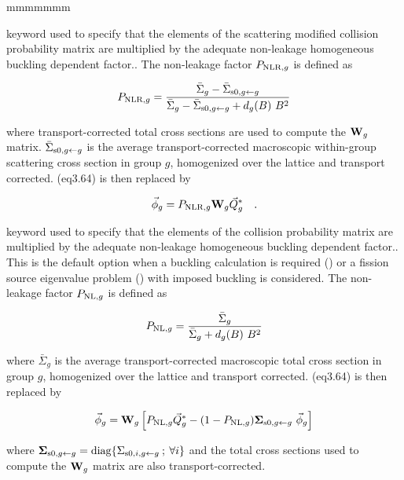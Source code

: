 \begin{ListeDeDescription}{mmmmmmm}
\item[\moc{PNLR}] keyword used to specify that the elements of the scattering
modified collision probability matrix
are multiplied by the adequate non-leakage homogeneous buckling dependent
factor.\cite{ALSB1}. The non-leakage
factor $P_{{\rm NLR},g}$ is defined as

\begin{equation}
P_{{\rm NLR},g}={\bar\Sigma_g-\bar\Sigma_{{\rm s0},g \gets g}\over{\bar\Sigma_g-\bar\Sigma_{{\rm s0},g \gets g}+d_g(B) \ B^2}}
\end{equation}

\noindent where transport-corrected total
cross sections are used to compute the ${\bf W}_g$ matrix. $\bar\Sigma_{{\rm s0},g \gets g}$ is the average
transport-corrected macroscopic within-group scattering cross section in group $g$,
homogenized over the lattice and transport corrected. \eq(eq3.64) is then replaced by
 
\begin{equation}
\vec\phi_g=P_{{\rm NLR},g} {\bf W}_g \vec Q^*_g \ \ \ .
\label{eq:eq5.36}
\end{equation}

\item[\moc{PNL}] keyword used to specify that the elements of the collision
probability matrix
are multiplied by the adequate non-leakage homogeneous buckling dependent
factor.\cite{ALSB1}. This is the default option when a buckling
calculation is required () or a fission source eigenvalue problem ()
with imposed buckling is considered. The non-leakage
factor $P_{{\rm NL},g}$ is defined as

\begin{equation}
P_{{\rm NL},g}={\bar\Sigma_g\over{\bar\Sigma_g+d_g(B) \ B^2}}
\end{equation}

\noindent where $\bar\Sigma_g$ is the average transport-corrected macroscopic total cross section
in group $g$, homogenized over the lattice and transport corrected. \eq(eq3.64) is then replaced by

\begin{equation}
\vec\phi_g={\bf W}_g \left[ P_{{\rm NL},g} \vec Q^*_g -(1-P_{{\rm NL},g}) {\bf \Sigma}_{{\rm s0},g\gets g} \ \vec\phi_g \right]
\label{eq:eq5.33b}
\end{equation}

\noindent where ${\bf \Sigma}_{{\rm s0},g\gets g}={\rm diag} \{ \Sigma_{{\rm s0},i,g \gets g}\> ;\> \forall i \}$
and the total cross sections used to compute the ${\bf W}_g$ matrix are also
transport-corrected.


\end{ListeDeDescription}
